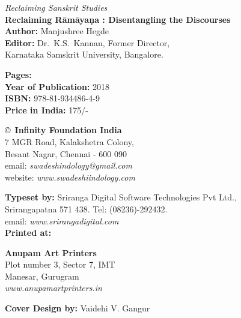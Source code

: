 \thispagestyle{empty}
\noindent
{\fontsize{9}{11}\selectfont\sl Reclaiming Sanskrit Studies}\\
{\bf Reclaiming Rāmāyaṇa : Disentangling the Discourses}\\ 
{\bf Author:} Manjushree Hegde\\
{\bf Editor:} Dr.\ K.S.\ Kannan, Former Director,\\ 
Karnataka Samskrit University, Bangalore.
\vfill

\noindent
{\bf Pages:} \pageref{book:end}\\
{\bf Year of Publication:} 2018\\
{\bf ISBN:} 978-81-934486-4-9\\
{\bf Price in India:} 175/-
\vfill

\noindent
\copyright\ {\bf Infinity Foundation India}\\ 
7 MGR Road, Kalakshetra Colony,\\ 
Besant Nagar, Chennai - 600 090\\
email: {\sl swadeshindology@gmail.com}\\
website: {\sl www.swadeshiindology.com} 
\vfill

\noindent
{\bf Typeset by:} Sriranga Digital Software Technologies Pvt Ltd.,\\ 
Srirangapatna 571 438. Tel: (08236)-292432.\\
email: {\sl www.srirangadigital.com}\\

\noindent
{\bf Printed at:}

\noindent
{\bf Anupam Art Printers}\\
Plot number 3, Sector 7, IMT\\
Manesar, Gurugram\\
{\sl www.anupamartprinters.in}

\medskip
\noindent
{\bf Cover Design by:} Vaidehi V. Gangur
